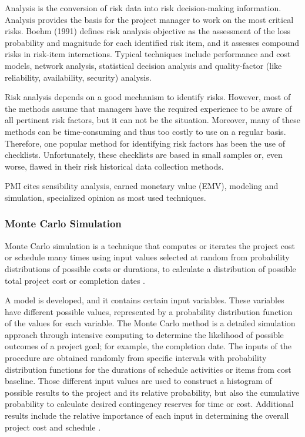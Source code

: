 \documentclass[a4paper,twoside]{article}
\begin{document}
\noindent Analysis is the conversion of risk data into risk decision-making information. Analysis provides the basis for the project manager to work on the most critical risks. Boehm (1991) defines risk analysis objective as the assessment of the loss probability and magnitude for each identified risk item, and it assesses compound risks in risk-item interactions. Typical techniques include performance and cost models, network analysis, statistical decision analysis and quality-factor (like reliability, availability, security) analysis.

Risk analysis depends on a good mechanism to identify risks. However, most of the methods assume that managers have the required experience to be aware of all pertinent risk factors, but it can not be the situation. Moreover, many of these methods can be time-consuming and thus too costly to use on a regular basis. Therefore, one popular method for identifying risk factors has been the use of checklists. Unfortunately, these checklists are based in small samples or, even worse, flawed in their risk historical data collection methods.

PMI \cite{PMBOK2008} cites sensibility analysis, earned monetary value (EMV), modeling and simulation, specialized opinion as most used techniques.

\subsubsection{Monte Carlo Simulation}

\noindent Monte Carlo simulation is a technique that computes or iterates the project cost or schedule many times using input values selected at random from probability distributions of possible costs or durations, to calculate a distribution of possible total project cost or completion dates \cite{PMBOK2008}.

A model is developed, and it contains certain input variables. These variables have different possible values, represented by a probability distribution function of the values for each variable. The Monte Carlo method is a detailed simulation approach through intensive computing to determine the likelihood of possible outcomes of a project goal; for example, the completion date. The inputs of the procedure are obtained randomly from specific intervals with probability distribution functions for the durations of schedule activities or items from cost baseline. Those different input values are used to construct a histogram of possible results to the project and its relative probability, but also the cumulative probability to calculate desired contingency reserves for time or cost. Additional results include the relative importance of each input in determining the overall project cost and schedule \cite{kwak2007exploring}.
\end{document}
